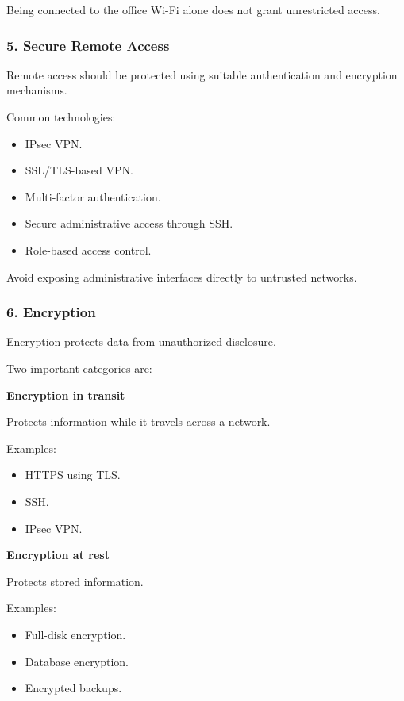Being connected to the office Wi-Fi alone does not grant unrestricted access.

\subsubsection{5. Secure Remote Access}

Remote access should be protected using suitable authentication and encryption mechanisms.

Common technologies:

\begin{itemize}
\item IPsec VPN.
\item SSL/TLS-based VPN.
\item Multi-factor authentication.
\item Secure administrative access through SSH.
\item Role-based access control.
\end{itemize}

Avoid exposing administrative interfaces directly to untrusted networks.

\subsubsection{6. Encryption}

Encryption protects data from unauthorized disclosure.

Two important categories are:

\textbf{Encryption in transit}

Protects information while it travels across a network.

Examples:

\begin{itemize}
\item HTTPS using TLS.
\item SSH.
\item IPsec VPN.
\end{itemize}

\textbf{Encryption at rest}

Protects stored information.

Examples:

\begin{itemize}
\item Full-disk encryption.
\item Database encryption.
\item Encrypted backups.
\end{itemize}

